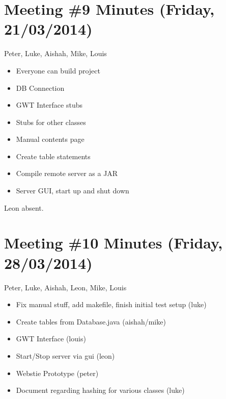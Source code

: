 \section{Meeting \#9 Minutes (Friday, 21/03/2014)}
Peter, Luke, Aishah, Mike, Louis
\begin{itemize}
\item Everyone can build project
\item DB Connection
\item GWT Interface stubs
\item Stubs for other classes
\item Manual contents page
\item Create table statements
\item Compile remote server as a JAR
\item Server GUI, start up and shut down
\end{itemize}
Leon absent.

\section{Meeting \#10 Minutes (Friday, 28/03/2014)}
Peter, Luke, Aishah, Leon, Mike, Louis
\begin{itemize}
\item Fix manual stuff, add makefile, finish initial test setup (luke)
\item Create tables from Database.java (aishah/mike)
\item GWT Interface (louis)
\item Start/Stop server via gui (leon)
\item Webstie Prototype (peter)
\item Document regarding hashing for various classes (luke)
\end{itemize}

